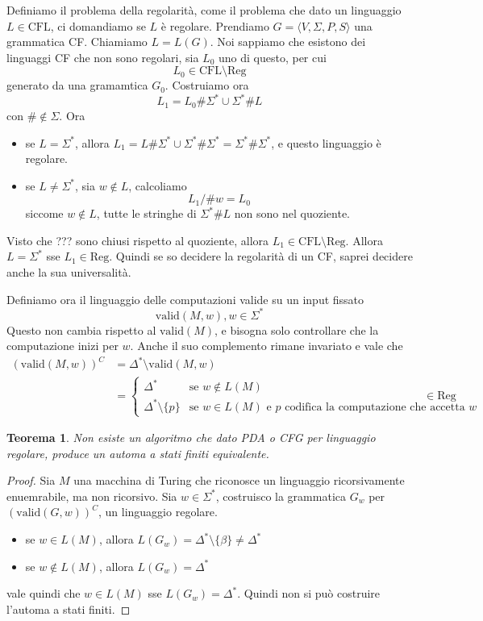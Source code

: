 \documentclass[12pt]{report}
\newtheorem{teorema}{Teorema}
\theoremstyle{definition}
\begin{document}
Definiamo il problema della regolarità, come il problema che dato un linguaggio $L \in \text{CFL}$, ci domandiamo se $L$ è regolare.
Prendiamo $G = \langle V, \Sigma, P, S \rangle$ una grammatica CF.
Chiamiamo $L = L(G)$.	%
Noi sappiamo che esistono dei linguaggi CF che non sono regolari, sia $L_0$ uno di questo, per cui
$$ L_0 \in \text{CFL} \setminus \text{Reg} $$
generato da una gramamtica $G_0$.
Costruiamo ora 
$$ L_1 = L_0 \# \Sigma^* \cup \Sigma^* \# L$$
con $\# \not \in \Sigma$.
Ora
\begin{itemize}
	\item se $L = \Sigma^*$, allora $L_1 = L \# \Sigma^* \cup \Sigma^* \# \Sigma^* = \Sigma^* \# \Sigma^*$, e questo linguaggio è regolare.
	\item se $L \neq \Sigma^*$, sia $w \not \in L$, calcoliamo
		$$ L_1 / \# w = L_0 $$
		siccome $w \not \in L$, tutte le stringhe di $\Sigma^* \# L$ non sono nel quoziente.
\end{itemize}
Visto che ??? sono chiusi rispetto al quoziente, allora $L_1 \in \text{CFL} \setminus \text{Reg}$.
Allora $L = \Sigma^*$ sse $L_1 \in \text{Reg}$.
Quindi se so decidere la regolarità di un CF, saprei decidere anche la sua universalità.

Definiamo ora il linguaggio delle computazioni valide su un input fissato
$$ \text{valid}(M, w), w \in \Sigma^* $$
Questo non cambia rispetto al $\text{valid}(M)$, e bisogna solo controllare che la computazione inizi per $w$.
Anche il suo complemento rimane invariato e vale che
\begin{align*}
	(\text{valid}(M, w))^C &= \Delta^* \setminus \text{valid}(M, w) \\
	                       &= \begin{cases} \Delta^* & \text{se } w \not \in L(M) \\ \Delta^* \setminus \{ p \} & \text{se } w \in L(M) \text{ e $p$ codifica la computazione che accetta $w$} \end{cases} \in \text{Reg}
\end{align*}
\begin{teorema}
	Non esiste un algoritmo che dato PDA o CFG per linguaggio regolare, produce un automa a stati finiti equivalente.
\end{teorema}
\begin{proof}
	Sia $M$ una macchina di Turing che riconosce un linguaggio ricorsivamente enuemrabile, ma non ricorsivo.
	Sia $w \in \Sigma^*$, costruisco la grammatica $G_w$ per $(\text{valid}(G, w))^C$, un linguaggio regolare.
	\begin{itemize}
		\item se $w \in L(M)$, allora $L(G_w) = \Delta^* \setminus \{ \beta \} \neq \Delta^*$
		\item se $w \not \in L(M)$, allora $L(G_w) = \Delta^*$
	\end{itemize}
	vale quindi che $w \in L(M)$ sse $L(G_w) = \Delta^*$.
	Quindi non si può costruire l'automa a stati finiti.
\end{proof}
\end{document}
